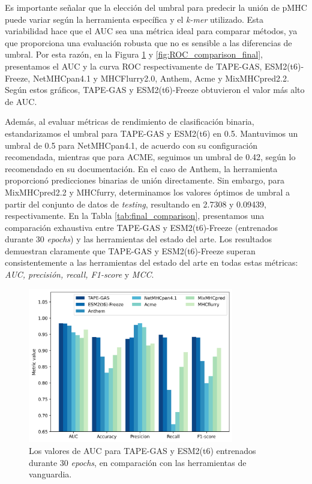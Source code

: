 Es importante señalar que la elección del umbral para predecir la unión de pMHC puede variar según la herramienta específica y el \textit{k-mer} utilizado. Esta variabilidad hace que el AUC sea una métrica ideal para comparar métodos, ya que proporciona una evaluación robusta que no es sensible a las diferencias de umbral. Por esta razón, en la Figura \ref{fig:comparison_final} y \ref{fig:ROC_comparison_final}, presentamos el AUC y la curva ROC respectivamente de TAPE-GAS, ESM2(t6)-Freeze, NetMHCpan4.1 y MHCFlurry2.0, Anthem, Acme y MixMHCpred2.2. Según estos gráficos, TAPE-GAS y ESM2(t6)-Freeze obtuvieron el valor más alto de AUC.

Además, al evaluar métricas de rendimiento de clasificación binaria, estandarizamos el umbral para TAPE-GAS y ESM2(t6) en 0.5. Mantuvimos un umbral de 0.5 para NetMHCpan4.1, de acuerdo con su configuración recomendada, mientras que para ACME, seguimos un umbral de 0.42, según lo recomendado en su documentación. En el caso de Anthem, la herramienta proporcionó predicciones binarias de unión directamente. Sin embargo, para MixMHCpred2.2 y MHCfurry, determinamos los valores óptimos de umbral a partir del conjunto de datos de \textit{testing}, resultando en 2.7308 y 0.09439, respectivamente. En la Tabla \ref{tab:final_comparison}, presentamos una comparación exhaustiva entre TAPE-GAS y ESM2(t6)-Freeze (entrenados durante 30 \textit{epochs}) y las herramientas del estado del arte. Los resultados demuestran claramente que TAPE-GAS y ESM2(t6)-Freeze superan consistentemente a las herramientas del estado del arte en todas estas métricas: \textit{AUC, precisión, recall, F1-score} y \textit{MCC}.

\begin{figure}
	\centering
	\includegraphics[width=0.8\textwidth]{img/results/metrics_comparison}
	\caption[Comparación del AUC con métodos del estado del arte]{Los valores de AUC para TAPE-GAS y ESM2(t6) entrenados durante 30 \textit{epochs}, en comparación con las herramientas de vanguardia.}
	\label{fig:comparison_final}
\end{figure}

